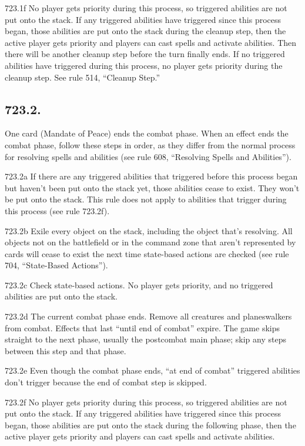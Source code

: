 723.1f No player gets priority during this process, so triggered abilities are not put onto the stack. If any triggered abilities have triggered since this process began, those abilities are put onto the stack during the cleanup step, then the active player gets priority and players can cast spells and activate abilities. Then there will be another cleanup step before the turn finally ends. If no triggered abilities have triggered during this process, no player gets priority during the cleanup step. See rule 514, “Cleanup Step.”

\subsection*{723.2.}
One card (Mandate of Peace) ends the combat phase. When an effect ends the combat phase, follow these steps in order, as they differ from the normal process for resolving spells and abilities (see rule 608, “Resolving Spells and Abilities”).

723.2a If there are any triggered abilities that triggered before this process began but haven’t been put onto the stack yet, those abilities cease to exist. They won’t be put onto the stack. This rule does not apply to abilities that trigger during this process (see rule 723.2f).

723.2b Exile every object on the stack, including the object that’s resolving. All objects not on the battlefield or in the command zone that aren’t represented by cards will cease to exist the next time state-based actions are checked (see rule 704, “State-Based Actions”).

723.2c Check state-based actions. No player gets priority, and no triggered abilities are put onto the stack.

723.2d The current combat phase ends. Remove all creatures and planeswalkers from combat. Effects that last “until end of combat” expire. The game skips straight to the next phase, usually the postcombat main phase; skip any steps between this step and that phase.

723.2e Even though the combat phase ends, “at end of combat” triggered abilities don’t trigger because the end of combat step is skipped.

723.2f No player gets priority during this process, so triggered abilities are not put onto the stack. If any triggered abilities have triggered since this process began, those abilities are put onto the stack during the following phase, then the active player gets priority and players can cast spells and activate abilities.

